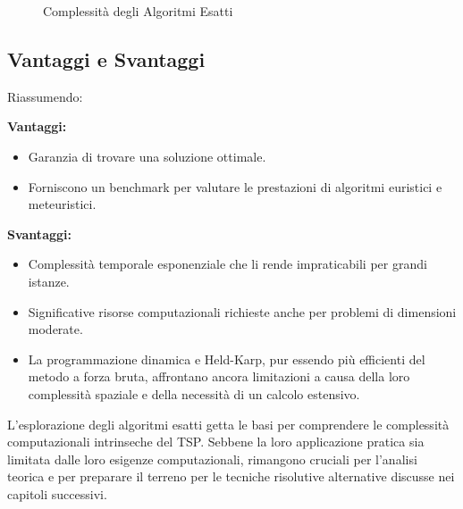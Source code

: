 \begin{figure}[h]
	\caption{Complessità degli Algoritmi Esatti}
	\label{fig:agl_complexity}
\end{figure}

\subsection{Vantaggi e Svantaggi}
Riassumendo:

\textbf{Vantaggi:}
\begin{itemize}
	\item Garanzia di trovare una soluzione ottimale.
	\item Forniscono un benchmark per valutare le prestazioni di algoritmi euristici e meteuristici.
\end{itemize}

\textbf{Svantaggi:}
\begin{itemize}
	\item Complessità temporale esponenziale che li rende impraticabili per grandi istanze.
	\item Significative risorse computazionali richieste anche per problemi di dimensioni moderate.
	\item La programmazione dinamica e Held-Karp, pur essendo più efficienti del metodo a forza bruta, affrontano ancora limitazioni a causa della loro complessità spaziale e della necessità di un calcolo estensivo.
\end{itemize}

L'esplorazione degli algoritmi esatti getta le basi per comprendere le complessità computazionali intrinseche del \gls{TSP}. Sebbene la loro applicazione pratica sia limitata dalle loro esigenze computazionali, rimangono cruciali per l'analisi teorica e per preparare il terreno per le tecniche risolutive alternative discusse nei capitoli successivi.

